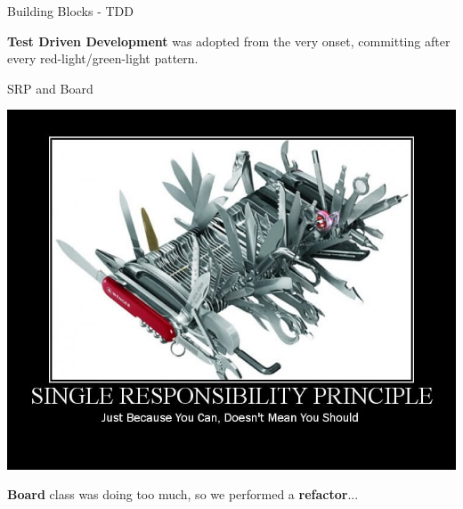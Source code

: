 \documentclass{beamer}
\begin{document}
  \begin{frame}{Building Blocks - TDD}

    \begin{centering}


    \end{centering}

    \vspace{1em}

    \textbf{Test Driven Development} was adopted from the very onset, committing after every red-light/green-light pattern.

  \end{frame}



  \begin{frame}{SRP and Board}

    \includegraphics[height=0.35\textwidth]{img/singleresponsibilityprinciple.jpg}

    \vspace{3em}

    \textbf{Board} class was doing too much, so we performed a \textbf{refactor}...

  \end{frame}
\end{document}
